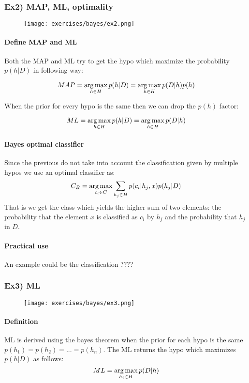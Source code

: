\subsubsection{Ex2) MAP, ML, optimality}
\begin{figure}[H]
    \centering
   \texttt{[image: exercises/bayes/ex2.png]}
\end{figure}

\paragraph{Define MAP and ML }
Both the MAP and ML try to get the hypo which maximize the probability $p(h|D)$ in following way:

$$MAP=\operatorname*{arg\,max}_{h \in H} p(h|D)=\operatorname*{arg\,max}_{h \in H} p(D|h)p(h)$$

When the prior for every hypo is the same then we can drop the $p(h)$ factor:

$$ML=\operatorname*{arg\,max}_{h \in H} p(h|D)=\operatorname*{arg\,max}_{h \in H} p(D|h)$$

\paragraph{Bayes optimal classifier}
Since the previous do not take into account the classification given by multiple hypos we use an optimal classifier as:
$$C_{B}=\operatorname*{arg\,max}_{c_i \in C}\sum_{h_j \in H} p(c_i| h_j,x)p(h_j|D)$$
That is we get the class which yields the higher sum of two elements: the probability that the element $x$ is classified as $c_i$ by $h_j$ and the probability that $h_j$ in $D$.

\paragraph{Practical use}
An example could be the classification ????


\subsubsection{Ex3) ML}
\begin{figure}[H]
    \centering
   \texttt{[image: exercises/bayes/ex3.png]}
\end{figure}

\paragraph{Definition}
ML is derived using the bayes theorem when the prior for each hypo is the same $p(h_1)=p(h_2)=...=p(h_n)$.
The ML returns the hypo which maximizes $p(h|D)$ as follows:
$$ML=\operatorname*{arg\,max}_{h_i \in H}p(D|h)$$

